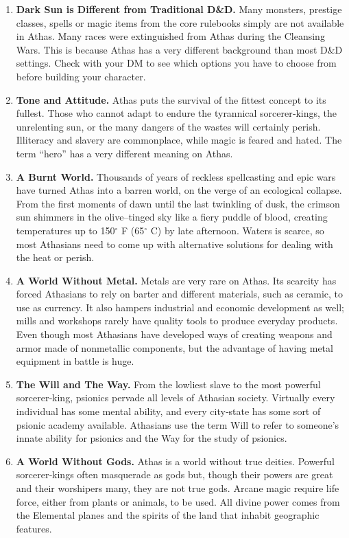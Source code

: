 \documentclass[10pt,a4paper,twocolumn]{d20}
\begin{document}
\begin{enumerate}
\item \textbf{Dark Sun is Different from Traditional D\&D.} Many monsters, prestige classes, spells or magic items from the core rulebooks simply are not available in Athas. Many races were extinguished from Athas during the Cleansing Wars. This is because Athas has a very different background than most D\&D settings. Check with your DM to see which options you have to choose from before building your character.
\item \textbf{Tone and Attitude.} Athas puts the survival of the fittest concept to its fullest. Those who cannot adapt to endure the tyrannical sorcerer‐kings, the unrelenting sun, or the many dangers of the wastes will certainly perish. Illiteracy and slavery are commonplace, while magic is feared and hated. The term ``hero'' has a very different meaning on Athas.
\item \textbf{A Burnt World.} Thousands of years of reckless spellcasting and epic wars have turned Athas into a barren world, on the verge of an ecological collapse. From the first moments of dawn until the last twinkling of dusk, the crimson sun shimmers in the olive–tinged sky like a fiery puddle of blood, creating temperatures up to 150$^\circ$ F (65$^\circ$ C) by late afternoon. Waters is scarce, so most Athasians need to come up with alternative solutions for dealing with the heat or perish.
\item \textbf{A World Without Metal.} Metals are very rare on Athas. Its scarcity has forced Athasians to rely on barter and different materials, such as ceramic, to use as currency. It also hampers industrial and economic development as well; mills and workshops rarely have quality tools to produce everyday products. Even though most Athasians have developed ways of creating weapons and armor made of nonmetallic components, but the advantage of having metal equipment in battle is huge.
\item \textbf{The Will and The Way.} From the lowliest slave to the most powerful sorcerer‐king, psionics pervade all levels of Athasian society. Virtually every individual has some mental ability, and every city‐state has some sort of psionic academy available. Athasians use the term Will to refer to someone’s innate ability for psionics and the Way for the study of psionics.
\item \textbf{A World Without Gods.} Athas is a world without true deities. Powerful sorcerer‐kings often masquerade as gods but, though their powers are great and their worshipers many, they are not true gods. Arcane magic require life force, either from plants or animals, to be used. All divine power comes from the Elemental planes and the spirits of the land that inhabit geographic features.

\end{enumerate}
\end{document}
